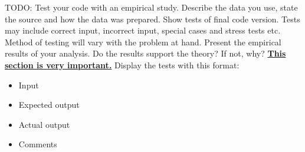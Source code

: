 TODO: Test your code with an empirical study. Describe the data you use, state the source and how
the data was prepared. Show tests of final code version. Tests may include correct input,
incorrect input, special cases and stress tests etc. Method of testing will vary with the
problem at hand. Present the empirical results of your analysis. Do the results support the
theory? If not, why? \underline{\textbf{This section is very important.}}
\newline
\newline
Display the tests with this format:
\begin{itemize}
  \item Input
  \item Expected output
  \item Actual output
  \item Comments
\end{itemize}


